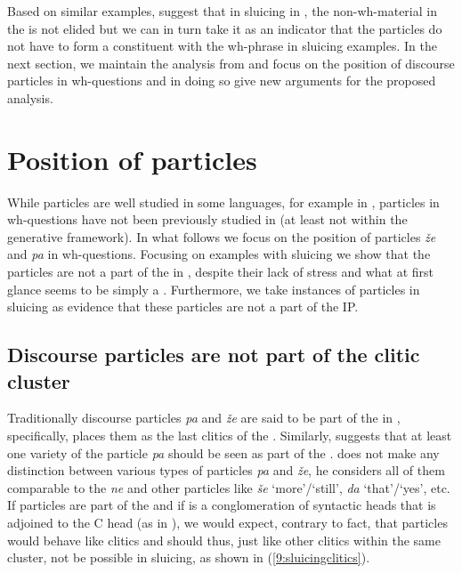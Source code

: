 \documentclass[output=paper,modfonts,newtxmath,hidelinks]{langscibook}
\begin{document}
\noindent Based on similar examples, \cite{marusicetal2015} suggest that in sluicing in , the non-wh-material in the  is not elided but we can in turn take it as an indicator that the particles do not have to form a constituent with the wh-phrase in sluicing examples. In the next section, we maintain the analysis from \cite{marusicetal2015} and focus on the position of discourse particles in  wh-questions and in doing so give new arguments for the proposed analysis.  

\section{Position of particles}\label{9:s4}

While particles are well studied in some languages, for example in , particles in wh-questions have not been previously studied in  (at least not within the generative framework). In what follows we focus on the position of particles \textit{že} and \textit{pa} in  wh-questions. Focusing on examples with sluicing we show that the particles are not a part of the  in , despite their lack of stress and what at first glance seems to be simply a  . Furthermore, we take instances of particles in sluicing as evidence that these particles are not a part of the IP.  

\subsection{Discourse particles are not part of the clitic cluster}

Traditionally discourse particles \textit{pa} and \textit{že} are said to be part of the  in , specifically, \cite{toporisic2000} places them as the last clitics of the . Similarly, \cite{oresnik1985naniz} suggests that at least one variety of the particle \textit{pa} should be seen as part of the . \cite{toporisic2000} does not make any distinction between various types of particles \textit{pa} and \textit{že}, he considers all of them comparable to the   \textit{ne} and other particles like \textit{še} `more'/`still', \textit{da} `that'/`yes', etc. If particles are part of the  and if  is a conglomeration of syntactic heads that is adjoined to the C head (as in \citealt{goldensheppard2000}), we would expect, contrary to fact, that particles would behave like clitics and should thus, just like other clitics within the same cluster, not be possible in sluicing, as shown in  (\ref{9:sluicingclitics}). 
\end{document}
